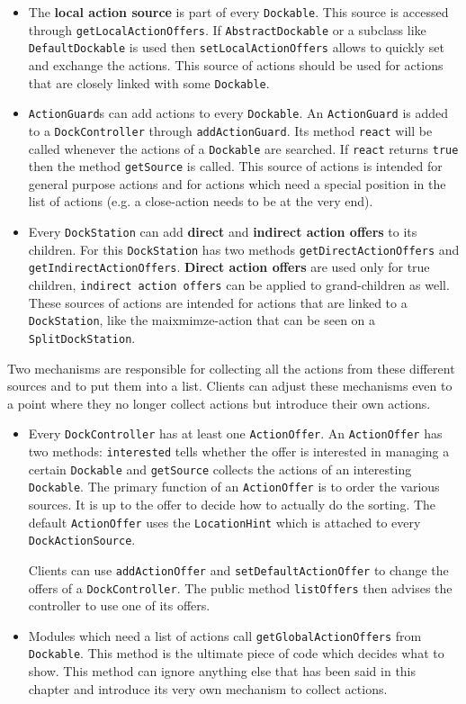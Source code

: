 \documentclass[a4paper,10pt]{article}
\newcommand{\src}[1]{\texttt{#1}}
\begin{document}
\begin{itemize}
 \item The \textbf{local action source} is part of every \src{Dockable}. This source is accessed through \src{getLocalActionOffers}. If \src{AbstractDockable} or a subclass like \src{DefaultDockable} is used then \src{setLocalActionOffers} allows to quickly set and exchange the actions. This source of actions should be used for actions that are closely linked with some \src{Dockable}.
 \item \src{ActionGuard}s can add actions to every \src{Dockable}. An \src{ActionGuard} is added to a \src{DockController} through \src{addActionGuard}. Its method \src{react} will be called whenever the actions of a \src{Dockable} are searched. If \src{react} returns \src{true} then the method \src{getSource} is called. This source of actions is intended for general purpose actions and for actions which need a special position in the list of actions (e.g. a close-action needs to be at the very end).
 \item Every \src{DockStation} can add \textbf{direct} and \textbf{indirect action offers} to its children. For this \src{DockStation} has two methods \src{getDirectActionOffers} and \src{getIndirectActionOffers}. \textbf{Direct action offers} are used only for true children, \src{indirect action offers} can be applied to grand-children as well. These sources of actions are intended for actions that are linked to a \src{DockStation}, like the maixmimze-action that can be seen on a \src{SplitDockStation}.
\end{itemize}

Two mechanisms are responsible for collecting all the actions from these different sources and to put them into a list. Clients can adjust these mechanisms even to a point where they no longer collect actions but introduce their own actions.

\begin{itemize}
 \item Every \src{DockController} has at least one \src{ActionOffer}. An \src{ActionOffer} has two methods: \src{interested} tells whether the offer is interested in managing a certain \src{Dockable} and \src{getSource} collects the actions of an interesting \src{Dockable}. The primary function of an \src{ActionOffer} is to order the various sources. It is up to the offer to decide how to actually do the sorting. The default \src{ActionOffer} uses the \src{LocationHint} which is attached to every \src{DockActionSource}.

Clients can use \src{addActionOffer} and \src{setDefaultActionOffer} to change the offers of a \src{DockController}. The public method \src{listOffers} then advises the controller to use one of its offers.

 \item Modules which need a list of actions call \src{getGlobalActionOffers} from \src{Dockable}. This method is the ultimate piece of code which decides what to show. This method can ignore anything else that has been said in this chapter and introduce its very own mechanism to collect actions. 
\end{itemize}
\end{document}
